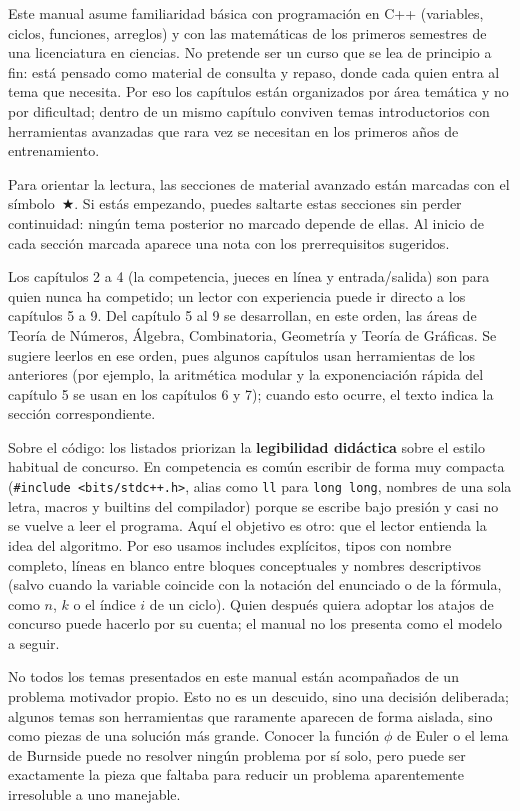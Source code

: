Este manual asume familiaridad básica con programación en C++ (variables, ciclos, funciones, arreglos) y con las matemáticas de los primeros semestres de una licenciatura en ciencias. No pretende ser un curso que se lea de principio a fin: está pensado como material de consulta y repaso, donde cada quien entra al tema que necesita. Por eso los capítulos están organizados por área temática y no por dificultad; dentro de un mismo capítulo conviven temas introductorios con herramientas avanzadas que rara vez se necesitan en los primeros años de entrenamiento.

Para orientar la lectura, las secciones de material avanzado están marcadas con el símbolo~$\bigstar$. Si estás empezando, puedes saltarte estas secciones sin perder continuidad: ningún tema posterior no marcado depende de ellas. Al inicio de cada sección marcada aparece una nota con los prerrequisitos sugeridos.

Los capítulos 2 a 4 (la competencia, jueces en línea y entrada/salida) son para quien nunca ha competido; un lector con experiencia puede ir directo a los capítulos 5 a 9. Del capítulo 5 al 9 se desarrollan, en este orden, las áreas de Teoría de Números, Álgebra, Combinatoria, Geometría y Teoría de Gráficas. Se sugiere leerlos en ese orden, pues algunos capítulos usan herramientas de los anteriores (por ejemplo, la aritmética modular y la exponenciación rápida del capítulo 5 se usan en los capítulos 6 y 7); cuando esto ocurre, el texto indica la sección correspondiente.

Sobre el código: los listados priorizan la \textbf{legibilidad didáctica} sobre el estilo habitual de concurso. En competencia es común escribir de forma muy compacta (\texttt{\#include <bits/stdc++.h>}, alias como \texttt{ll} para \texttt{long long}, nombres de una sola letra, macros y builtins del compilador) porque se escribe bajo presión y casi no se vuelve a leer el programa. Aquí el objetivo es otro: que el lector entienda la idea del algoritmo. Por eso usamos includes explícitos, tipos con nombre completo, líneas en blanco entre bloques conceptuales y nombres descriptivos (salvo cuando la variable coincide con la notación del enunciado o de la fórmula, como $n$, $k$ o el índice $i$ de un ciclo). Quien después quiera adoptar los atajos de concurso puede hacerlo por su cuenta; el manual no los presenta como el modelo a seguir.

No todos los temas presentados en este manual están acompañados de un problema motivador propio. Esto no es un descuido, sino una decisión deliberada; algunos temas son herramientas que raramente aparecen de forma aislada, sino como piezas de una solución más grande. Conocer la función $\phi$ de Euler o el lema de Burnside puede no resolver ningún problema por sí solo, pero puede ser exactamente la pieza que faltaba para reducir un problema aparentemente irresoluble a uno manejable.
 
